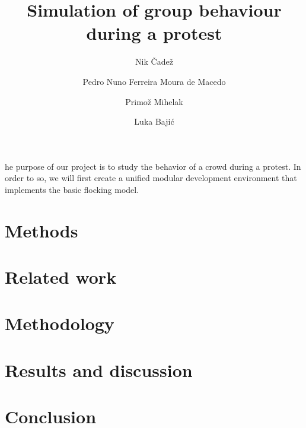 \documentclass[9pt]{pnas-new}
\title{Simulation of group behaviour during a protest}
\author{Nik Čadež}
\author{Pedro Nuno Ferreira Moura de Macedo}
\author{Primož Mihelak}
\author{Luka Bajić}
\affil{Collective behaviour course research seminar report}
\begin{document}
\verticaladjustment{-2pt}

\maketitle
\thispagestyle{firststyle}

he purpose of our project is to study the behavior of a crowd during a protest. In order to so, we will first create a unified modular development environment that implements the basic flocking model. \cite{protests} \cite{crowdcontrol} \cite{psychology}



\section*{Methods}

\section*{Related work}

\section*{Methodology}



\section*{Results and discussion}


\section*{Conclusion}

\showacknow %


\begin{multicols}{2}
\section*{\bibname}

\end{multicols}
\end{document}

